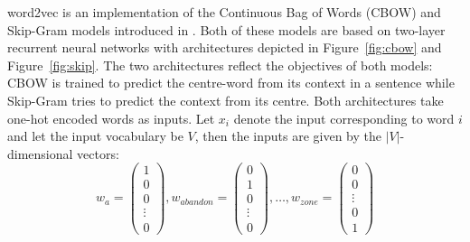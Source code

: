 \documentclass[conference]{IEEEtran}
\begin{document}
word2vec is an implementation of the Continuous Bag of Words (CBOW) and Skip-Gram
models introduced in \cite{mikolov2013efficient}. Both of these models are based
on  two-layer recurrent neural networks with architectures depicted in Figure~\ref{fig:cbow}
and Figure~\ref{fig:skip}. The two architectures reflect the objectives of both models: CBOW
is trained to predict the centre-word from its context in a sentence while Skip-Gram tries to predict
the context from its centre. Both architectures take one-hot encoded words as inputs. Let $x_i$
denote the input corresponding to word $i$ and let the input vocabulary be $V$, 
then the inputs are given by the $|V|$-dimensional vectors:
\begin{equation}
w_{a} = \begin{pmatrix}1 \\ 0 \\ 0 \\ \vdots \\ 0 \end{pmatrix},
w_{abandon} = \begin{pmatrix}0 \\ 1 \\ 0 \\ \vdots \\ 0 \end{pmatrix}, \dots ,
w_{zone} = \begin{pmatrix}0 \\ 0  \\ \vdots \\ 0 \\ 1 \end{pmatrix}
\end{equation}
\end{document}
